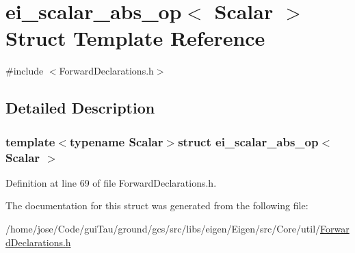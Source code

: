 \hypertarget{structei__scalar__abs__op}{\section{ei\-\_\-scalar\-\_\-abs\-\_\-op$<$ Scalar $>$ Struct Template Reference}
\label{structei__scalar__abs__op}
}


{\ttfamily \#include $<$Forward\-Declarations.\-h$>$}



\subsection{Detailed Description}
\subsubsection*{template$<$typename Scalar$>$struct ei\-\_\-scalar\-\_\-abs\-\_\-op$<$ Scalar $>$}



Definition at line 69 of file Forward\-Declarations.\-h.



The documentation for this struct was generated from the following file\-:\begin{DoxyCompactItemize}
\item 
/home/jose/\-Code/gui\-Tau/ground/gcs/src/libs/eigen/\-Eigen/src/\-Core/util/\hyperlink{_forward_declarations_8h}{Forward\-Declarations.\-h}\end{DoxyCompactItemize}
